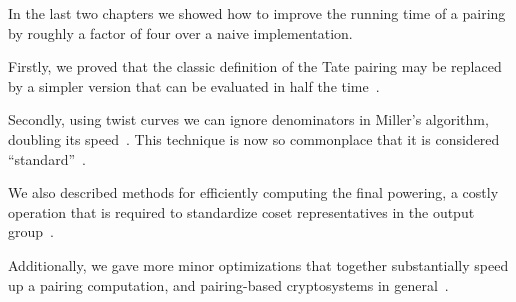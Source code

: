 In the last two chapters we showed how to
improve the running time of a pairing
by roughly a factor of four over a naive implementation.

Firstly, we proved that the classic definition of the
Tate pairing may be replaced by a simpler version that
can be evaluated in half the time~\cite{bakls}.

Secondly, using twist curves we can ignore denominators
in Miller's algorithm, doubling its speed~\cite{bals2}.
This technique is now so commonplace that it is
considered ``standard''~\cite{hsv}.

We also described methods for efficiently computing
the final powering, a costly operation that is required
to standardize coset representatives in the output group~\cite{bakls}.

Additionally, we gave more minor optimizations that together
substantially speed up a pairing computation, and pairing-based cryptosystems
in general~\cite{bakls, bals2}.
